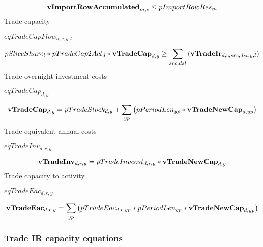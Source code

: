 \documentclass{article}
\begin{document}
\begin{dmath} 
{\bf vImportRowAccumulated}_{m,c}  \le  pImportRowRes_{m}
\end{dmath} 
Trade capacity







$eqTradeCapFlow_{d,c,y,l}$





\begin{dmath} 
pSliceShare_{l}*pTradeCap2Act_{d}*{\bf vTradeCap}_{d,y}  \ge  \sum_{src,dst}{\left({\bf vTradeIr}_{d,c,src,dst,y,l}\right)}
\end{dmath} 
Trade overnight investment costs







$eqTradeCap_{d,y}$





\begin{dmath} 
{\bf vTradeCap}_{d,y}  =  pTradeStock_{d,y}+\sum_{yp}{\left(pPeriodLen_{yp}*{\bf vTradeNewCap}_{d,yp}\right)}
\end{dmath} 
Trade equivalent annual costs







$eqTradeInv_{d,r,y}$





\begin{dmath} 
{\bf vTradeInv}_{d,r,y}  =  pTradeInvcost_{d,r,y}*{\bf vTradeNewCap}_{d,y}
\end{dmath} 
Trade capacity to activity







$eqTradeEac_{d,r,y}$





\begin{dmath} 
{\bf vTradeEac}_{d,r,y}  =  \sum_{yp}{\left(pTradeEac_{d,r,yp}*pPeriodLen_{yp}*{\bf vTradeNewCap}_{d,yp}\right)}
\end{dmath} 
\subsubsection*{Trade IR capacity equations}
\end{document}
